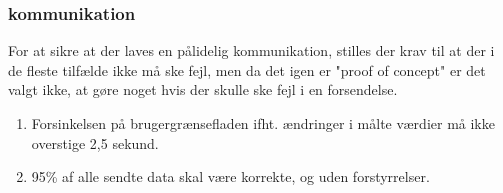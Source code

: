 \subsubsection{kommunikation}
For at sikre at der laves en pålidelig kommunikation, stilles der krav til at der i de fleste tilfælde ikke må ske fejl, men da det igen er "proof of concept" er det valgt ikke, at gøre noget hvis der skulle ske fejl i en forsendelse.

\begin{enumerate}
	\item Forsinkelsen på brugergrænsefladen ifht. ændringer i målte værdier må ikke overstige 2,5 sekund. 
	\item 95\% af alle sendte data skal være korrekte, og uden forstyrrelser. 
\end{enumerate} 

